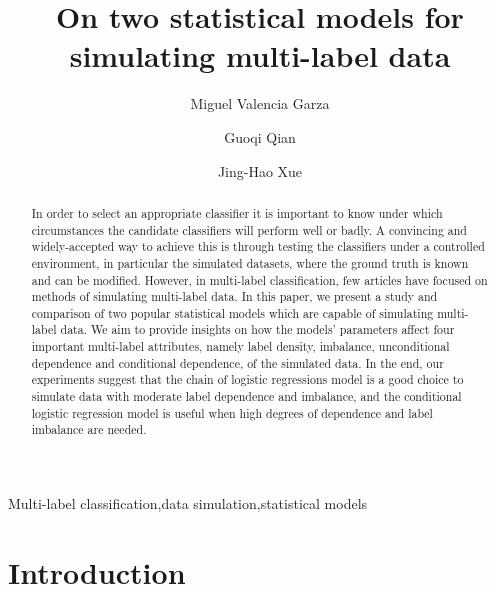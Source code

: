 \documentclass[review]{elsarticle}
\begin{document}
	
	\begin{frontmatter}
		
		\title{On two statistical models for simulating multi-label data}
		
		\author[UCL]{Miguel Valencia Garza}
		\author[MEL]{Guoqi Qian}
		\author[UCL]{Jing-Hao Xue}
		\address[UCL]{Department of Statistical Science, University College London, London WC1E 6BT, UK}
		\address[MEL]{School of Mathematics and Statistics, The University of Melbourne, Parkville VIC 3010, Australia}
		
		\begin{abstract}
			In order to select an appropriate classifier it is important to know under which circumstances the candidate classifiers will perform well or badly. A convincing and widely-accepted way to achieve this is through testing the classifiers under a controlled environment, in particular the simulated datasets, where the ground truth is known and can be modified. However, in multi-label classification, few articles have focused on methods of simulating multi-label data. In this paper, we present a study and comparison of two popular statistical models which are capable of simulating multi-label data. We aim to provide insights on how the models' parameters affect four important multi-label attributes, namely label density, imbalance, unconditional dependence and conditional dependence, of the simulated data. In the end, our experiments suggest that the chain of logistic regressions model is a good choice to simulate data with moderate label dependence and imbalance, and the conditional logistic regression model is useful when high degrees of dependence and label imbalance are needed. 
		\end{abstract}
		
		\begin{keyword}
			Multi-label classification\sep data simulation\sep statistical models
		\end{keyword}
		
	\end{frontmatter}
	
	\linenumbers
	
	
	\section{Introduction}
	\label{INTRO}
	
\end{document}
